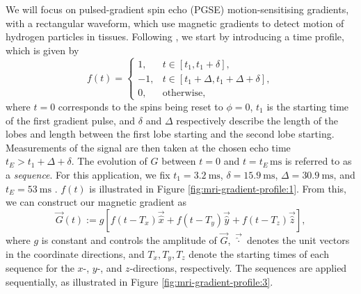         We will focus on pulsed-gradient spin echo (PGSE) motion-sensitising gradients, with a rectangular waveform, which use magnetic gradients to detect motion of hydrogen particles in tissues. Following \citeauthor{nguyenFiniteElementsMethod2014} \cite{nguyenFiniteElementsMethod2014}, we start by introducing a time profile, which is given by
        \begin{equation}
            f(t) = 
            \begin{cases}
                1,  & t \in [t_1, t_1 + \delta], \\
                -1, & t \in [t_1 + \Delta, t_1 + \Delta + \delta], \\
                0,  & \text{otherwise}, 
            \end{cases}
            \label{eq:time-profile}
        \end{equation}
        where $t=0$ corresponds to the spins being reset to $\phi=0$, $t_1$ is the starting time of the first gradient pulse, and $\delta$ and $\Delta$ respectively describe the length of the lobes and length between the first lobe starting and the second lobe starting. Measurements of the signal are then taken at the chosen echo time $t_E > t_1 + \Delta + \delta$. The evolution of $G$ between $t=0$ and $t=t_E\,\unit{\milli\second}$ is referred to as a \textit{sequence}. For this application, we fix $t_1 = \qty{3.2}{\milli\second}$, $\delta = \qty{15.9}{\milli\second}$, $\Delta = \qty{30.9}{\milli\second}$, and $t_E = \qty{53}{\milli\second}$ \cite{dellschaftHaemodynamicsHumanPlacenta2020}. $f(t)$ is illustrated in Figure \ref{fig:mri-gradient-profile:1}. From this, we can construct our magnetic gradient as  
        \begin{equation}
            \vec{G}(t) := g \left[ f(t-T_x) \vec{\hat{x}} + f(t-T_y) \vec{\hat{y}} + f(t-T_z) \vec{\hat{z}} \right],
            \label{eq:g}
        \end{equation}
        where $g$ is constant and controls the amplitude of $\vec{G}$, $\vec{\hat{\cdot}}$ denotes the unit vectors in the coordinate directions, and $T_x, T_y, T_z$ denote the starting times of each sequence for the $x$-, $y$-, and $z$-directions, respectively. The sequences are applied sequentially, as illustrated in Figure \ref{fig:mri-gradient-profile:3}.
    
